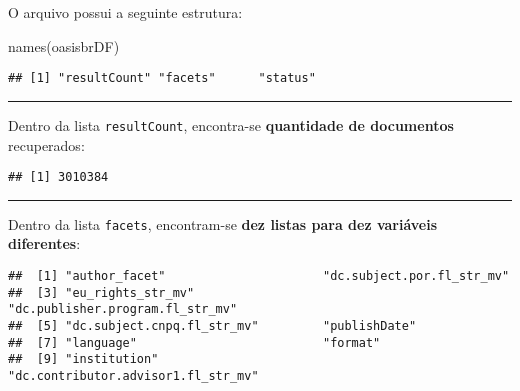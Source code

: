 \documentclass[
]{article}
\newenvironment{Shaded}{\begin{snugshade}}{\end{snugshade}}
\newcommand{\FunctionTok}[1]{\textcolor[rgb]{0.00,0.00,0.00}{#1}}
\newcommand{\NormalTok}[1]{#1}
\newcommand{\SpecialCharTok}[1]{\textcolor[rgb]{0.00,0.00,0.00}{#1}}
\begin{document}
O arquivo possui a seguinte estrutura:

\begin{Shaded}
\begin{Highlighting}[]
\FunctionTok{names}\NormalTok{(oasisbrDF)}
\end{Highlighting}
\end{Shaded}

\begin{verbatim}
## [1] "resultCount" "facets"      "status"
\end{verbatim}

\begin{center}\rule{0.5\linewidth}{0.5pt}\end{center}

Dentro da lista \texttt{resultCount}, encontra-se \textbf{quantidade de
documentos} recuperados:

\begin{Shaded}
\end{Shaded}

\begin{verbatim}
## [1] 3010384
\end{verbatim}

\begin{center}\rule{0.5\linewidth}{0.5pt}\end{center}

Dentro da lista \texttt{facets}, encontram-se \textbf{dez listas para
dez variáveis diferentes}:

\begin{Shaded}
\end{Shaded}

\begin{verbatim}
##  [1] "author_facet"                      "dc.subject.por.fl_str_mv"         
##  [3] "eu_rights_str_mv"                  "dc.publisher.program.fl_str_mv"   
##  [5] "dc.subject.cnpq.fl_str_mv"         "publishDate"                      
##  [7] "language"                          "format"                           
##  [9] "institution"                       "dc.contributor.advisor1.fl_str_mv"
\end{verbatim}
\end{document}
